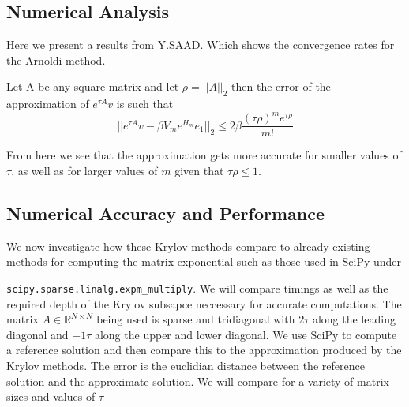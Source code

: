 \subsection{Numerical Analysis}
Here we present a results from Y.SAAD\cite{Saad1992}. Which shows the convergence rates for the Arnoldi method.

\begin{theorem}
    Let A be any square matrix and let \(\rho=||A||_2\) then the error of the approximation of \(e^{\tau A}v\) is such that
    \[ ||e^{\tau A}v - \beta V_m e^{H_m}e_1||_2 \leq 2\beta \frac{(\tau \rho)^m e^{\tau \rho}}{m!} \]
\end{theorem}
From here we see that the approximation gets more accurate for smaller values of $\tau$, as well as for larger values of $m$ given that $\tau \rho\leq1$.

\subsection{Numerical Accuracy and Performance}
We now investigate how these Krylov methods compare to already existing methods for computing the matrix exponential such as those used in SciPy under 

\verb|scipy.sparse.linalg.expm_multiply|\cite{AlMohy2011}\cite{Higham2010}.
We will compare timings as well as the required depth of the Krylov subsapce neccessary for accurate computations.
The matrix $A \in \mathbb{R}^{N \times N}$ being used is sparse and tridiagonal with $2\tau$ along the leading diagonal and $-1\tau$ along the upper and lower diagonal.
We use SciPy to compute a reference solution and then compare this to the approximation produced by the Krylov methods.
The error is the euclidian distance between the reference solution and the approximate solution.
We will compare for a variety of matrix sizes and values of $\tau$

